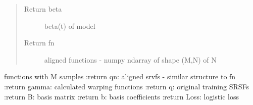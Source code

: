 \documentclass[letterpaper,10pt,english]{sphinxmanual}
\begin{document}
\begin{fulllineitems}
\begin{quote}
\begin{description}
\item[{Return beta}] \leavevmode
beta(t) of model

\item[{Return fn}] \leavevmode
aligned functions - numpy ndarray of shape (M,N) of N

\end{description}\end{quote}

functions with M samples
:return qn: aligned srvfs - similar structure to fn
:return gamma: calculated warping functions
:return q: original training SRSFs
:return B: basis matrix
:return b: basis coefficients
:return Loss: logistic loss

\end{fulllineitems}

\end{document}
